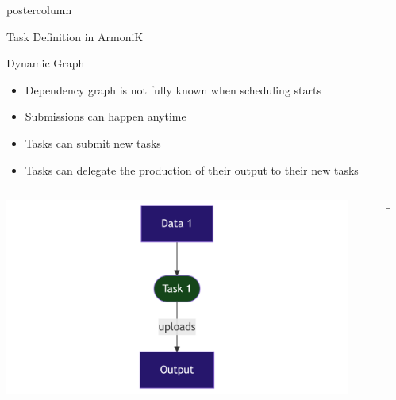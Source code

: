 \begin{frame}[fragile]
\begin{columns}
\begin{column}{.49\textwidth}
\begin{beamercolorbox}[center,wd=\textwidth]{postercolumn}
\begin{minipage}[T]{.95\textwidth}
{            \begin{block}{Task Definition in ArmoniK}
            
            \end{block}

            \begin{block}{Dynamic Graph}
            \begin{itemize}
                \item Dependency graph is not fully known when scheduling starts
                \item Submissions can happen anytime
                \item Tasks can submit new tasks
                \item Tasks can delegate the production of their output to their new tasks
            \end{itemize}
            \begin{columns}[T]
            \begin{column}{0.3\textwidth}
                \centering
                \vspace{1cm}
                \vfill
                \includegraphics[width=0.95\textwidth]{mermaid-dynamic-part1.png}
            \end{column}
            \begin{column}{0.05\textwidth}
                \centering
                \vspace{1.7cm}
                \vfill
                $\Rightarrow$
            \end{column}
            \begin{column}{0.65\textwidth}
                \centering
                \footnotesize

\end{column}
\end{columns}
\end{block}}
\end{minipage}
\end{beamercolorbox}
\end{column}
\end{columns}
\end{frame}
